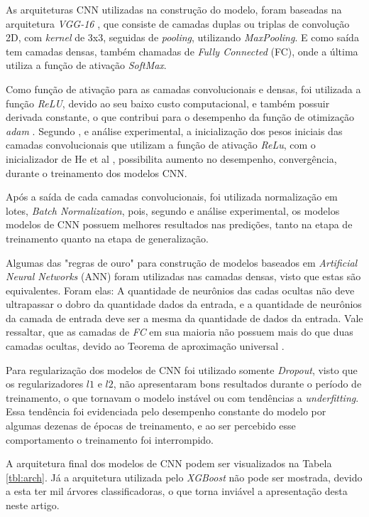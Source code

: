 As arquiteturas CNN utilizadas na construção do modelo, foram baseadas na arquitetura \emph{VGG-16} \cite{}, que consiste de camadas duplas ou triplas de convolução 2D, com \emph{kernel} de 3x3, seguidas de \emph{pooling}, utilizando \emph{MaxPooling}. E como saída tem camadas densas, também chamadas de \emph{Fully Connected} (FC), onde a última utiliza a função de ativação \emph{SoftMax}.

Como função de ativação para as camadas convolucionais e densas, foi utilizada a função \emph{ReLU}, devido ao seu baixo custo computacional, e também possuir derivada constante, o que contribui para o desempenho da função de otimização \emph{adam} \cite{}. Segundo \cite{}, e análise experimental, a inicialização dos pesos iniciais das camadas convolucionais que utilizam a função de ativação \emph{ReLu}, com o inicializador de He et al \cite{}, possibilita aumento no desempenho, convergência, durante o treinamento dos modelos CNN.

Após a saída de cada camadas convolucionais, foi utilizada normalização em lotes, \emph{Batch Normalization}, pois, segundo \cite{} e análise experimental, os modelos modelos de CNN possuem melhores resultados nas predições, tanto na etapa de treinamento quanto na etapa de generalização.

Algumas das "regras de ouro" \cite{} para construção de modelos baseados em \emph{Artificial Neural Networks} (ANN) foram utilizadas nas camadas densas, visto que estas são equivalentes. Foram elas: A quantidade de neurônios das cadas ocultas não deve ultrapassar o dobro da quantidade dados da entrada, e a quantidade de neurônios da camada de entrada deve ser a mesma da quantidade de dados da entrada. Vale ressaltar, que as camadas de \emph{FC} em sua maioria não possuem mais do que duas camadas ocultas, devido ao Teorema de aproximação universal \cite{}.

Para regularização dos modelos de CNN foi utilizado somente \emph{Dropout}, visto que os regularizadores $l1$ e $l2$, não apresentaram bons resultados durante o período de treinamento, o que tornavam o modelo instável ou com tendências a \emph{underfitting}. Essa tendência foi evidenciada pelo desempenho constante do modelo por algumas dezenas de épocas de treinamento, e ao ser percebido esse comportamento o treinamento foi interrompido.

A arquitetura final dos modelos de CNN podem ser visualizados na Tabela \ref{tbl:arch}. Já a arquitetura utilizada pelo \emph{XGBoost} não pode ser mostrada, devido a esta ter mil árvores classificadoras, o que torna inviável a apresentação desta neste artigo.



